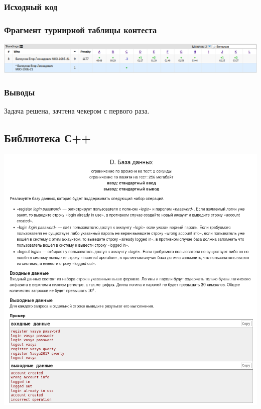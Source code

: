 \subsubsection*{Исходный код}


\subsubsection*{Фрагмент турнирной таблицы контеста}
\begin{center}
\includegraphics[width=\textwidth]{standings/20220630/table.png}\newline\noindent
\end{center}

\subsubsection*{Выводы}

Задача решена, зачтена чекером с первого раза.

\pagebreak

\subsection*{Библиотека С++}
\begin{center}
\includegraphics[width=\textwidth]{statements/20220701/D.png}
\end{center}
